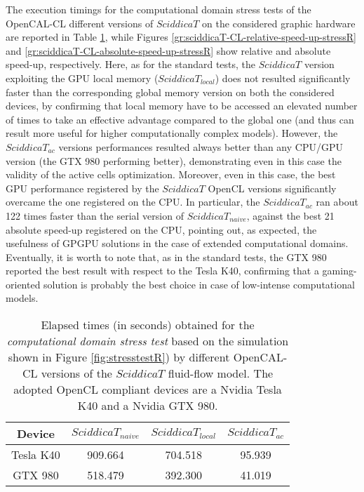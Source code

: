 The execution timings for the computational domain stress tests of
the OpenCAL-CL different versions of $SciddicaT$ on the considered
graphic hardware are reported in Table
\ref{tab:sciddicaT-CL-execution-times-stressR}, while Figures
\ref{gr:sciddicaT-CL-relative-speed-up-stressR} and
\ref{gr:sciddicaT-CL-absolute-speed-up-stressR} show relative and
absolute speed-up, respectively. Here, as for the standard tests,
the $SciddicaT$ version exploiting the GPU local memory
($SciddicaT_{local}$) does not resulted significantly faster than
the corresponding global memory version on both the considered
devices, by confirming that local memory have to be accessed an
elevated number of times to take an effective advantage compared
to the global one (and thus can result more useful for higher
computationally complex models). However, the $SciddicaT_{ac}$
versions performances resulted always better than any CPU/GPU
version (the GTX 980 performing better), demonstrating even in
this case the validity of the active cells optimization. Moreover,
even in this case, the best GPU performance registered by the
$SciddicaT$ OpenCL versions significantly overcame the one
registered on the CPU. In particular, the $SciddicaT_{ac}$ ran
about 122 times faster than the serial version of
$SciddicaT_{naive}$, against the best 21 absolute speed-up
registered on the CPU, pointing out, as expected, the usefulness
of GPGPU solutions in the case of extended computational
domains. Eventually, it is worth to note that, as in the standard
tests, the GTX 980 reported the best result with respect to the
Tesla K40, confirming that a gaming-oriented solution is probably
the best choice in case of low-intense computational models.
\begin{table}
	\centering
	\begin{tabular}{cccc}
		\hline Device & $SciddicaT_{naive}$ & $SciddicaT_{local}$ &
		$SciddicaT_{ac}$ \\ \hline Tesla K40 & 909.664 & 704.518 &
		95.939\\ GTX 980 & 518.479 & 392.300 & 41.019\\ \hline
	\end{tabular}
	\caption{Elapsed times (in seconds) obtained for the \emph{computational domain stress test} based on the simulation shown in Figure
	\ref{fig:stresstestR}) by different OpenCAL-CL versions of the
	$SciddicaT$ fluid-flow model. The adopted OpenCL compliant devices are
	a Nvidia Tesla K40 and a Nvidia GTX 980.}
	\label{tab:sciddicaT-CL-execution-times-stressR}
\end{table}


